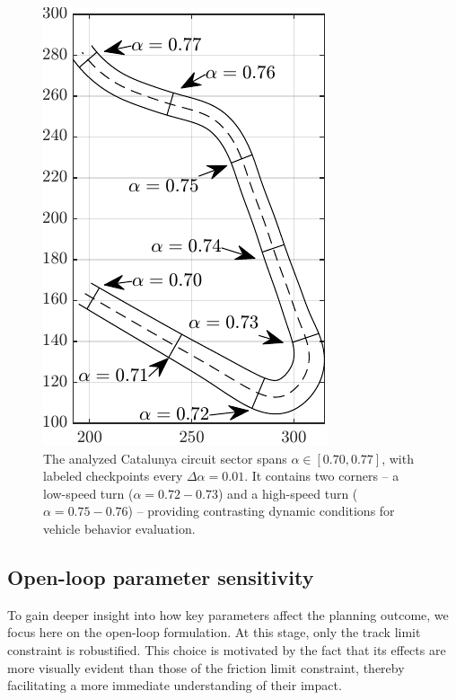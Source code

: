 \begin{figure}
	\centering
	\includegraphics{Fig/track.pdf}
	\caption{The analyzed Catalunya circuit sector spans $\alpha \in [0.70, 0.77]$, with labeled checkpoints every $\Delta\alpha = 0.01$. It contains two corners -- a low-speed turn ($\alpha = 0.72-0.73$) and a high-speed turn ($\alpha = 0.75-0.76$) -- providing contrasting dynamic conditions for vehicle behavior evaluation.}
	\label{fig:track}
\end{figure}

\subsection{Open-loop parameter sensitivity}
\label{sec:ol_param_sensitivity}
To gain deeper insight into how key parameters affect the planning outcome, we focus here on the open-loop formulation.
At this stage, only the track limit constraint is robustified.
This choice is motivated by the fact that its effects are more visually evident than those of the friction limit constraint, thereby facilitating a more immediate understanding of their impact.

